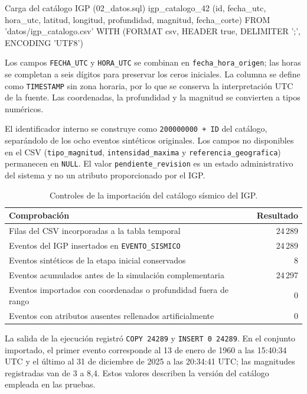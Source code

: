 \documentclass[12pt,a4paper]{article}
\begin{document}
\begin{sqlbloque}{Carga del catálogo IGP (02\_datos.sql)}
\copy igp_catalogo_42 (id, fecha_utc, hora_utc, latitud, longitud, profundidad, magnitud, fecha_corte) FROM 'datos/igp_catalogo.csv' WITH (FORMAT csv, HEADER true, DELIMITER ';', ENCODING 'UTF8')
\end{sqlbloque}

Los campos \texttt{FECHA\_UTC} y \texttt{HORA\_UTC} se combinan en
\texttt{fecha\_hora\_origen}; las horas se completan a seis dígitos
para preservar los ceros iniciales. La columna se define como
\texttt{TIMESTAMP} sin zona horaria, por lo que se conserva la
interpretación UTC de la fuente. Las coordenadas, la profundidad y la
magnitud se convierten a tipos numéricos.

El identificador interno se construye como \texttt{200000000 + ID} del
catálogo, separándolo de los ocho eventos sintéticos originales. Los
campos no disponibles en el CSV (\texttt{tipo\_magnitud},
\texttt{intensidad\_maxima} y \texttt{referencia\_geografica})
permanecen en \texttt{NULL}. El valor \texttt{pendiente\_revision}
es un estado administrativo del sistema y no un atributo proporcionado
por el IGP.

\begin{table}[H]
\centering
\begin{tabular}{p{9.8cm}r}
\toprule
\textbf{Comprobación} & \textbf{Resultado} \\
\midrule
Filas del CSV incorporadas a la tabla temporal & 24\,289 \\
Eventos del IGP insertados en \texttt{EVENTO\_SISMICO} & 24\,289 \\
Eventos sintéticos de la etapa inicial conservados & 8 \\
Eventos acumulados antes de la simulación complementaria & 24\,297 \\
Eventos importados con coordenadas o profundidad fuera de rango & 0 \\
Eventos con atributos ausentes rellenados artificialmente & 0 \\
\bottomrule
\end{tabular}
\caption{Controles de la importación del catálogo sísmico del IGP.}
\label{tab:igp-importacion-42}
\end{table}

La salida de la ejecución registró \texttt{COPY 24289} y
\texttt{INSERT 0 24289}. En el conjunto importado, el primer evento
corresponde al 13 de enero de 1960 a las 15:40:34 UTC y el último al
31 de diciembre de 2025 a las 20:34:41 UTC; las magnitudes registradas
van de 3 a 8,4. Estos valores describen la versión del catálogo
empleada en las pruebas.
\end{document}
